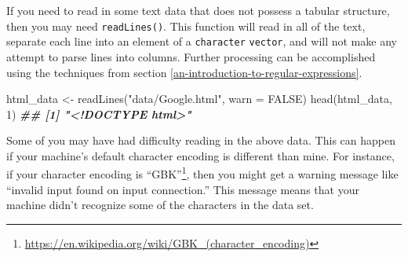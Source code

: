 \documentclass[
  12pt,
  krantz2]{krantz}
\makeatletter
\newenvironment{Shaded}{\begin{snugshade}}{\end{snugshade}}
\newcommand{\AttributeTok}[1]{\textcolor[rgb]{0.61,0.61,0.61}{#1}}
\newcommand{\CommentTok}[1]{\textcolor[rgb]{0.37,0.37,0.37}{\textit{#1}}}
\newcommand{\ConstantTok}[1]{\textcolor[rgb]{0,0,0}{#1}}
\newcommand{\DecValTok}[1]{\textcolor[rgb]{0.06,0.06,0.06}{#1}}
\newcommand{\DocumentationTok}[1]{\textcolor[rgb]{0.37,0.37,0.37}{\textbf{\textit{#1}}}}
\newcommand{\FunctionTok}[1]{\textcolor[rgb]{0,0,0}{#1}}
\newcommand{\NormalTok}[1]{#1}
\newcommand{\OtherTok}[1]{\textcolor[rgb]{0.37,0.37,0.37}{#1}}
\newcommand{\StringTok}[1]{\textcolor[rgb]{0.5,0.5,0.5}{#1}}
\renewcommand{\href}[2]{#2\footnote{\url{#1}}}
\newenvironment{kframe}{%
\medskip{}
\setlength{\fboxsep}{.8em}
 \def\at@end@of@kframe{}%
 \ifinner\ifhmode%
  \def\at@end@of@kframe{\end{minipage}}%
  \begin{minipage}{\columnwidth}%
 \fi\fi%
 \def\FrameCommand##1{\hskip\@totalleftmargin \hskip-\fboxsep
 \colorbox{shadecolor}{##1}\hskip-\fboxsep
     \hskip-\linewidth \hskip-\@totalleftmargin \hskip\columnwidth}%
 \MakeFramed {\advance\hsize-\width
   \@totalleftmargin\z@ \linewidth\hsize
   \@setminipage}}%
 {\par\unskip\endMakeFramed%
 \at@end@of@kframe}
\renewenvironment{Shaded}{\begin{kframe}}{\end{kframe}}
\makeatother
\begin{document}
\begin{Shaded}
\end{Shaded}

If you need to read in some text data that does not possess a tabular structure, then you may need \texttt{readLines()}. This function will read in all of the text, separate each line into an element of a \texttt{character} \texttt{vector}, and will not make any attempt to parse lines into columns. Further processing can be accomplished using the techniques from section \ref{an-introduction-to-regular-expressions}.

\begin{Shaded}
\begin{Highlighting}[]
\NormalTok{html\_data }\OtherTok{\textless{}{-}} \FunctionTok{readLines}\NormalTok{(}\StringTok{"data/Google.html"}\NormalTok{, }\AttributeTok{warn =} \ConstantTok{FALSE}\NormalTok{)}
\FunctionTok{head}\NormalTok{(html\_data, }\DecValTok{1}\NormalTok{)}
\DocumentationTok{\#\# [1] "\textless{}!DOCTYPE html\textgreater{}"}
\end{Highlighting}
\end{Shaded}

Some of you may have had difficulty reading in the above data. This can happen if your machine's default character encoding is different than mine. For instance, if your character encoding is \href{https://en.wikipedia.org/wiki/GBK_(character_encoding)}{``GBK''}, then you might get a warning message like ``invalid input found on input connection.'' This message means that your machine didn't recognize some of the characters in the data set.
\end{document}
